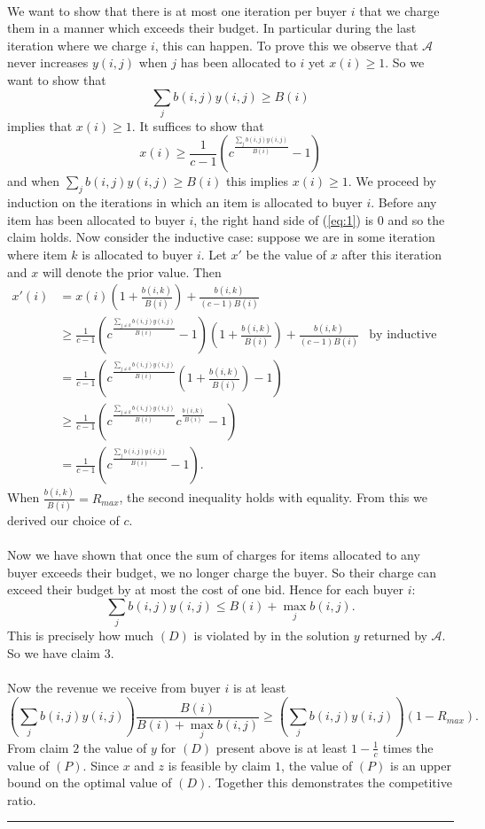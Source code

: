 \documentclass[letterpaper,12pt,oneside,onecolumn]{article}
\newcommand{\cA}{\mathcal{A}} \newcommand{\cB}{\mathcal{B}}
\newenvironment{proof}{{\bf Proof:  }}{\hfill\rule{2mm}{2mm}}
\begin{document}
\begin{proof}
\paragraph{}
We want to show that there is at most one iteration per buyer $i$ that we charge them in a manner which exceeds their budget. In particular during the last iteration where we charge $i$, this can happen. To prove this we observe that $\cA$ never increases $y(i,j)$ when $j$ has been allocated to $i$ yet $x(i) \geq 1$. So we want to show that 
$$\sum_j b(i,j)y(i,j) \geq B(i)$$
implies that $x(i) \geq 1$. It suffices to show that 
\begin{equation}\label{eq:1}
x(i) \geq \frac{1}{c-1}(c^{\frac{\sum_j b(i,j)y(i,j)}{B(i)}} -1)
\end{equation}
and when $\sum_j b(i,j)y(i,j) \geq B(i)$ this implies $x(i) \geq 1$. We proceed by induction on the iterations in which an item is allocated to buyer $i$. Before any item has been allocated to buyer $i$, the right hand side of (\ref{eq:1}) is $0$ and so the claim holds. Now consider the inductive case: suppose we are in some iteration where item $k$ is allocated to buyer $i$. Let $x'$ be the value of $x$ after this iteration and $x$ will denote the prior value. Then
\begin{align*}
x'(i) &= x(i)(1+\frac{b(i,k)}{B(i)}) + \frac{b(i,k)}{(c-1)B(i)} \\
&\geq \frac{1}{c-1}(c^{\frac{\sum_{j\neq k} b(i,j)y(i,j)}{B(i)}} -1)(1+\frac{b(i,k)}{B(i)}) + \frac{b(i,k)}{(c-1)B(i)}  &\text{by inductive hypothesis}\\
&= \frac{1}{c-1}(c^{\frac{\sum_{j\neq k} b(i,j)y(i,j)}{B(i)}}(1+\frac{b(i,k)}{B(i)}) - 1) \\
&\geq \frac{1}{c-1}(c^{\frac{\sum_{j\neq k} b(i,j)y(i,j)}{B(i)}}c^{\frac{b(i,k)}{B(i)}} -1) \\
&=\frac{1}{c-1}(c^{\frac{\sum_{j} b(i,j)y(i,j)}{B(i)}} -1).
\end{align*}
When $\frac{b(i,k)}{B(i)} = R_{max}$, the second inequality holds with equality. From this we derived our choice of $c$.
\paragraph{}
Now we have shown that once the sum of charges for items allocated to any buyer exceeds their budget, we no longer charge the buyer. So their charge can exceed their budget by at most the cost of one bid. Hence for each buyer $i$:
$$\sum_j b(i,j)y(i,j) \leq B(i) + \max_j b(i,j).$$
This is precisely how much $(D)$ is violated by in the solution $y$ returned by $\cA$. So we have claim $3$.
\paragraph{}
Now the revenue we receive from buyer $i$ is at least
$$(\sum_j b(i,j)y(i,j)) \frac{B(i)}{B(i) + \max_j b(i,j)} \geq (\sum_j b(i,j)y(i,j)) (1-R_{max}).$$
From claim $2$ the value of $y$ for $(D)$ present above is at least $1-\frac{1}{c}$ times the value of $(P)$. Since $x$ and $z$ is feasible by claim $1$, the value of $(P)$ is an upper bound on the optimal value of $(D)$. Together this demonstrates the competitive ratio.
\end{proof}
\end{document}
